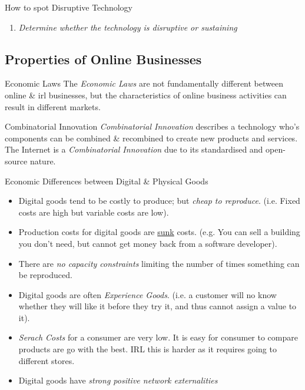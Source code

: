 \documentclass[11pt,a4paper]{article}
\begin{document}
\begin{proposition}{How to spot Disruptive Technology}
  \begin{enumerate}
    \item \textit{Determine whether the technology is disruptive or sustaining}
  \end{enumerate}
\end{proposition}

\subsection{Properties of Online Businesses}

\begin{remark}{Economic Laws}
  The \textit{Economic Laws} are not fundamentally different between online \& irl businesses, but the characteristics of online business activities can result in different markets.
\end{remark}

\begin{definition}{Combinatorial Innovation}
  \textit{Combinatorial Innovation} describes a technology who's components can be combined \& recombined to create new products and services. The Internet is a \textit{Combinatorial Innovation} due to its standardised and open-source nature.
\end{definition}

\begin{proposition}{Economic Differences between Digital \& Physical Goods}
  \begin{itemize}
    \item Digital goods tend to be costly to produce; but \textit{cheap to reproduce}. (i.e. Fixed costs are high but variable costs are low).
    \item Production costs for digital goods are \underline{sunk} costs. (e.g. You can sell a building you don't need, but cannot get money back from a software developer).
    \item There are \textit{no capacity constraints} limiting the number of times something can be reproduced.
    \item Digital goods are often \textit{Experience Goods}. (i.e. a customer will no know whether they will like it before they try it, and thus cannot assign a value to it).
    \item \textit{Serach Costs} for a consumer are very low. It is easy for consumer to compare products are go with the best. IRL this is harder as it requires going to different stores.
    \item Digital goods have \textit{strong positive network externalities}
  \end{itemize}
\end{proposition}
\end{document}
